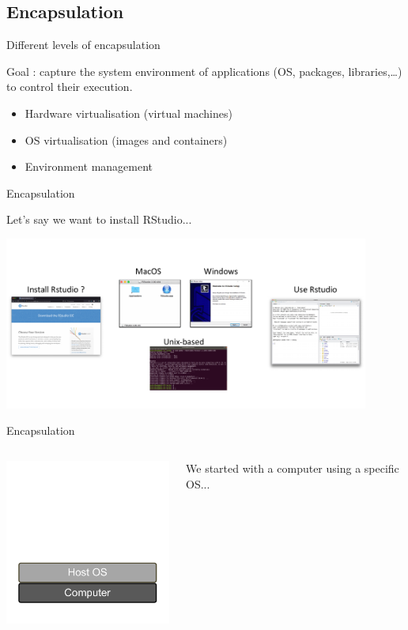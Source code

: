 \subsection{Encapsulation}

\begin{frame}{Different levels of encapsulation}


Goal : capture the system environment of applications (OS, packages, libraries,…) to control their execution.

\begin{itemize}
  \item Hardware virtualisation (virtual machines) \logoVirtualbox 
  \item OS virtualisation (images and containers) \logoDockerPortrait
  \item Environment management \logoConda
\end{itemize}

\end{frame}

\begin{frame}{Encapsulation}

Let's say we want to install RStudio...

\includegraphics[width=12cm]{02_encapsulation/figures/install_R_v2.pdf}


\end{frame}

\begin{frame}{Encapsulation}
\begin{columns}

\includegraphics[width=6cm]{02_encapsulation/figures/intro_encapsulation_v2-0.pdf}

We started with a computer using a specific OS...
\end{columns}
\end{frame}


